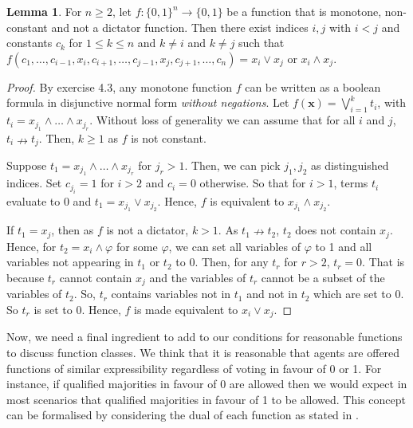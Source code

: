 \documentclass[11pt,a4paper, titlepage]{article}
\theoremstyle{definition}
\newtheorem{lemma}[theorem]{Lemma}
\let\vec\mathbf
\begin{document}
\begin{lemma}
    \label{lem:boolean}
    For $n \geq 2$, let $f \colon \{0,1\}^n \longrightarrow \{0,1\}$ be a function that is monotone, non-constant and not a dictator function.
    Then there exist indices $i, j$ with $i < j$ and constants $c_k$ for $1 \leq k \leq n$ and $k \neq i$ and $k \neq j$ such that $f(c_1, \ldots, c_{i-1}, x_i, c_{i+1}, \ldots, c_{j-1}, x_j, c_{j+1}, \ldots, c_n) = x_i \lor x_j$ or $x_i \land x_j$.
\end{lemma}

\begin{proof}
    By \cite{boolean} exercise 4.3, any monotone function $f$ can be written as a boolean formula in disjunctive normal form \emph{without negations}.
    Let $f(\vec{x}) = \bigvee_{i = 1}^k t_i$, with $t_i = x_{j_1} \land \ldots \land x_{j_r}$.
    Without loss of generality we can assume that for all $i$ and $j$, $t_i \nrightarrow t_j$.
    Then, $k \geq 1$ as $f$ is not constant.
    
    Suppose $t_1 = x_{j_1} \land \ldots \land x_{j_r}$ for $j_r > 1$. 
    Then, we can pick $j_1, j_2$ as distinguished indices. Set $c_{j_i} = 1$ for $i > 2$ and $c_i = 0$ otherwise.
    So that for $i > 1$, terms $t_i$ evaluate to $0$ and $t_1 =x_{j_1} \lor x_{j_2}$.
    Hence, $f$ is equivalent to $x_{j_1} \land x_{j_2}$.
    
    If $t_1 = x_j$, then as $f$ is not a dictator, $k > 1$.
    As $t_1 \nrightarrow t_2$, $t_2$ does not contain $x_j$.
    Hence, for $t_2 = x_i \land \varphi$ for some $\varphi$, we can set all variables of $\varphi$ to 1 and all variables not appearing in $t_1$ or $t_2$ to 0.
    Then, for any $t_r$ for $r > 2$, $t_r = 0$. That is because $t_r$ cannot contain $x_j$ and the variables of $t_r$ cannot be a subset of the variables of $t_2$.
    So, $t_r$ contains variables not in $t_1$ and not in $t_2$ which are set to $0$. So $t_r$ is set to 0.
    Hence, $f$ is made equivalent to $x_i \lor x_j$.
\end{proof}

Now, we need a final ingredient to add to our conditions for reasonable functions to discuss function classes.
We think that it is reasonable that agents are offered functions of similar expressibility regardless of voting in favour of 0 or 1.
For instance, if qualified majorities in favour of 0 are allowed then we would expect in most scenarios that qualified majorities in favour of 1 to be allowed.
This concept can be formalised by considering the dual of each function as stated in \cite{boolean}.
\end{document}
